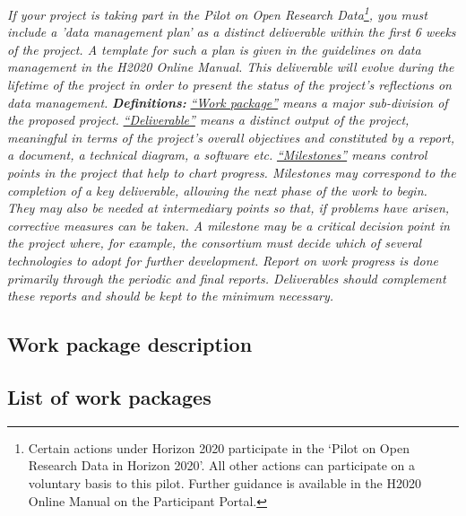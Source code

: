 {\vskip0.2cm
\emph{If your project is taking part in the Pilot on Open Research Data\footnote{Certain actions under Horizon 2020 participate in the ‘Pilot on Open Research Data in Horizon 2020’. All other actions can participate on a voluntary basis to this pilot.  Further guidance is available in the H2020 Online Manual on the Participant Portal.}, you must include a 'data management plan' as a distinct deliverable within the first 6 weeks of the project. A template for such a plan is given in the guidelines on data management in the H2020 Online Manual. This deliverable will evolve during the lifetime of the project in order to present the status of the project's reflections on data management.}
\vskip0.2cm
\emph{\noindent \textbf{Definitions:}}
\vskip0.2cm
\emph{\ul{``Work package''} means a major sub-division of the proposed project.}
\vskip0.2cm
\emph{\ul{``Deliverable''} means a distinct output of the project, meaningful in terms of the project's overall objectives and constituted by a report, a document, a technical diagram, a software etc.}
\vskip0.2cm
\emph{\ul{``Milestones''} means control points in the project that help to chart progress. Milestones may correspond to the completion of a key deliverable, allowing the next phase of the work to begin. They may also be needed at intermediary points so that, if problems have arisen, corrective measures can be taken. A milestone may be a critical decision point in the project where, for example, the consortium must decide which of several technologies to adopt for further development.}
\vskip0.2cm
\emph{\noindent Report on work progress is done primarily through the periodic and final reports. Deliverables should complement these reports and should be kept to the minimum necessary.}
}

%

\subsection{Work package description}
\label{sec:wps}




\subsection{List of work packages}
\label{sec:wplist}
\makewplist

